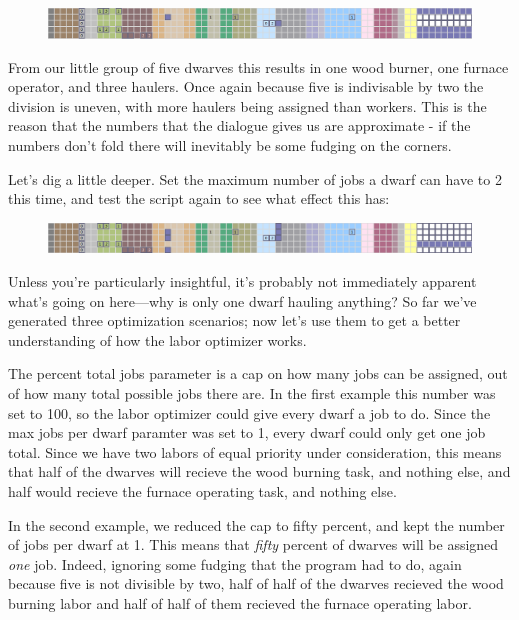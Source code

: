 \documentclass[]{article}
\begin{document}
\begin{figure}[h!] \centering \includegraphics[width=\linewidth]{Sec4Fig11}
\end{figure}

From our little group of five dwarves this results in one wood burner, one furnace operator, and three
haulers. Once again because five is indivisable by two the division is uneven, with more haulers being
assigned than workers.  This is the reason that the numbers that the dialogue gives us are approximate -
if the numbers don't fold there will inevitably be some fudging on the corners.

Let's dig a little deeper. Set the maximum number of jobs a dwarf can have to 2 this time, and test the
script again to see what effect this has:
\begin{figure}[h!] \centering \includegraphics[width=\linewidth]{Sec4Fig12}
\end{figure}

Unless you're particularly insightful, it's probably not immediately apparent what's going on here---why
is only one dwarf hauling anything? So far we've generated three optimization scenarios; now let's use
them to get a better understanding of how the labor optimizer works.

The percent total jobs parameter is a cap on how many jobs can be assigned, out of how many total
possible jobs there are. In the first example this number was set to 100, so the labor optimizer could
give every dwarf a job to do. Since the max jobs per dwarf paramter was set to 1, every dwarf could only
get one job total. Since we have two labors of equal priority under consideration, this means that half
of the dwarves will recieve the wood burning task, and nothing else, and half would recieve the furnace
operating task, and nothing else.

In the second example, we reduced the cap to fifty percent, and kept the number of jobs per dwarf at 1.
This means that \emph{fifty} percent of dwarves will be assigned \emph{one} job. Indeed, ignoring some
fudging that the program had to do, again because five is not divisible by two, half of half of the
dwarves recieved the wood burning labor and half of half of them recieved the furnace operating labor.
\end{document}
